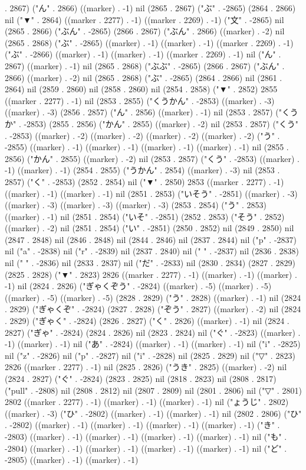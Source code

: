 . 2867) ("ん" . 2866) ((marker) . -1) nil (2865 . 2867) ("ぶ" . -2865) (2864 . 2866) nil ("▼" . 2864) ((marker . 2277) . -1) ((marker . 2269) . -1) ("文" . -2865) nil (2865 . 2866) ("ぶん" . -2865) (2866 . 2867) ("ぶん" . 2866) ((marker) . -2) nil (2865 . 2868) ("ぶ" . -2865) ((marker) . -1) ((marker) . -1) ((marker . 2269) . -1) ("ぶ" . -2866) ((marker) . -1) ((marker) . -1) ((marker . 2269) . -1) nil ("ん" . 2867) ((marker) . -1) nil (2865 . 2868) ("ぶぶ" . -2865) (2866 . 2867) ("ぶん" . 2866) ((marker) . -2) nil (2865 . 2868) ("ぶ" . -2865) (2864 . 2866) nil (2861 . 2864) nil (2859 . 2860) nil (2858 . 2860) nil (2854 . 2858) ("▼" . 2852) 2855 ((marker . 2277) . -1) nil (2853 . 2855) ("くうかん" . -2853) ((marker) . -3) ((marker) . -3) (2856 . 2857) ("ん" . 2856) ((marker) . -1) nil (2853 . 2857) ("くうか" . -2853) (2855 . 2856) ("かん" . 2855) ((marker) . -2) nil (2853 . 2857) ("くう" . -2853) ((marker) . -2) ((marker) . -2) ((marker) . -2) ((marker) . -2) ("う" . -2855) ((marker) . -1) ((marker) . -1) ((marker) . -1) ((marker) . -1) nil (2855 . 2856) ("かん" . 2855) ((marker) . -2) nil (2853 . 2857) ("くう" . -2853) ((marker) . -1) ((marker) . -1) (2854 . 2855) ("うかん" . 2854) ((marker) . -3) nil (2853 . 2857) ("く" . -2853) (2852 . 2854) nil ("▼" . 2850) 2853 ((marker . 2277) . -1) ((marker) . -1) ((marker) . -1) nil (2851 . 2853) ("いそう" . -2851) ((marker) . -3) ((marker) . -3) ((marker) . -3) ((marker) . -3) (2853 . 2854) ("う" . 2853) ((marker) . -1) nil (2851 . 2854) ("いそ" . -2851) (2852 . 2853) ("そう" . 2852) ((marker) . -2) nil (2851 . 2854) ("い" . -2851) (2850 . 2852) nil (2849 . 2850) nil (2847 . 2848) nil (2846 . 2848) nil (2844 . 2846) nil (2837 . 2844) nil ("p" . -2837) nil ("a" . -2838) nil ("r" . -2839) nil (2837 . 2840) nil (" " . -2837) nil (2836 . 2838) nil (" " . -2836) nil (2833 . 2837) nil ("だ" . -2833) nil (2830 . 2834) (2827 . 2829) (2825 . 2828) ("▼" . 2823) 2826 ((marker . 2277) . -1) ((marker) . -1) ((marker) . -1) nil (2824 . 2826) ("ぎゃくぞう" . -2824) ((marker) . -5) ((marker) . -5) ((marker) . -5) ((marker) . -5) (2828 . 2829) ("う" . 2828) ((marker) . -1) nil (2824 . 2829) ("ぎゃくぞ" . -2824) (2827 . 2828) ("ぞう" . 2827) ((marker) . -2) nil (2824 . 2829) ("ぎゃく" . -2824) (2826 . 2827) ("く" . 2826) ((marker) . -1) nil (2824 . 2827) ("ぎゃ" . -2824) (2824 . 2826) nil (2823 . 2824) nil ("ぐ" . -2823) ((marker) . -1) ((marker) . -1) nil ("あ" . -2824) ((marker) . -1) ((marker) . -1) nil ("i" . -2825) nil ("z" . -2826) nil ("p" . -2827) nil ("i" . -2828) nil (2825 . 2829) nil ("▽" . 2823) 2826 ((marker . 2277) . -1) nil (2825 . 2826) ("うき" . 2825) ((marker) . -2) nil (2824 . 2827) ("ぐ" . -2824) (2823 . 2825) nil (2818 . 2823) nil (2808 . 2817) ("pull" . -2808) nil (2808 . 2812) nil (2807 . 2809) nil (2801 . 2806) nil ("▽" . 2801) 2802 ((marker . 2277) . -1) ((marker) . -1) ((marker) . -1) nil ("ょうじ" . 2802) ((marker) . -3) ("ひ" . -2802) ((marker) . -1) ((marker) . -1) nil (2802 . 2806) ("ひ" . -2802) ((marker) . -1) ((marker) . -1) ((marker) . -1) ((marker) . -1) ("き" . -2803) ((marker) . -1) ((marker) . -1) ((marker) . -1) ((marker) . -1) nil ("も" . -2804) ((marker) . -1) ((marker) . -1) ((marker) . -1) ((marker) . -1) nil ("ど" . -2805) ((marker) . -1) ((marker) . -1) 